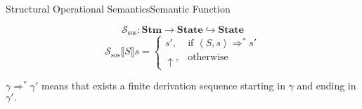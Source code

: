 \documentclass{beamer}
\newcommand{\Stm}{\textbf{Stm}}
\newcommand{\State}{\textbf{State}}
\newcommand{\sem}[2]{\mathcal{#1} \llbracket #2 \rrbracket}
\begin{document}
\begin{frame}{Structural Operational Semantics}{Semantic Function}

    $$\mathcal{S}_{\mathrm{sos}}: \Stm \to \State \hookrightarrow \State$$
    \begin{equation*}
        \sem{S_{\mathrm{sos}}}{S}s =
        \begin{cases}
            s',       & \mbox{if } \left< S, s \right> \Rightarrow^* s' \\
            \uparrow, & \mbox{otherwise}
        \end{cases}
    \end{equation*}

    $\gamma \Rightarrow^* \gamma'$ means that exists a finite derivation sequence starting in $\gamma$ and ending in $\gamma'.$

\end{frame}
\end{document}
